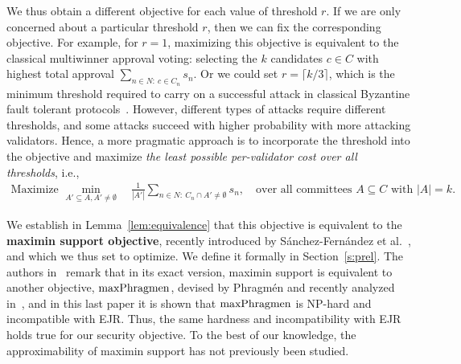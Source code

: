 We thus obtain a different objective for each value of threshold $r$. 
If we are only concerned about a particular threshold $r$, then we can fix the corresponding objective. 
For example, for $r=1$, maximizing this objective is equivalent to the classical multiwinner approval voting: selecting the $k$ candidates $c\in C$ with highest total approval $\sum_{n\in N: \ c\in C_n} s_n$. 
Or we could set $r=\lceil k/3\rceil$, which is the minimum threshold required to carry on a successful attack in classical Byzantine fault tolerant protocols~\cite{pease1980reaching}. 
However, different types of attacks require different thresholds, and some attacks succeed with higher probability with more attacking validators. Hence, a more pragmatic approach is to incorporate the threshold into the objective and maximize \emph{the least possible per-validator cost over all thresholds}, i.e.,  
\begin{align}\label{eq:security}
    \text{Maximize } \min_{A'\subseteq A, A'\neq \emptyset} \quad \frac{1}{|A'|} \sum_{n\in N: \ C_n\cap A' \neq \emptyset} s_n, \quad \text{over all committees $A\subseteq C$ with $|A|=k$}.
\end{align}

We establish in Lemma~\ref{lem:equivalence} that this objective is equivalent to the \textbf{maximin support objective}, recently introduced by Sánchez-Fernández et al.~\cite{sanchez2016maximin}, and which we thus set to optimize. 
We define it formally in Section~\ref{s:prel}.
The authors in~\cite{sanchez2016maximin} remark that in its exact version, maximin support is equivalent to another objective, $\operatorname{maxPhragmen}$, devised by Phragm\'{e}n and recently analyzed in~\cite{brill2017phragmen}, and in this last paper it is shown that $\operatorname{maxPhragmen}$ is NP-hard and incompatible with EJR. 
Thus, the same hardness and incompatibility with EJR holds true for our security objective. 
To the best of our knowledge, the approximability of maximin support has not previously been studied.

